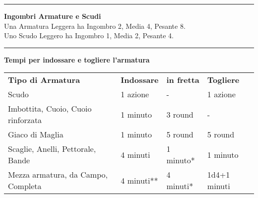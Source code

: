 \documentclass[a4paper,12 pt,openany]{book}
\newcommand{\riga}{\rule{\textwidth}{0.4pt}}
\begin{document}
\begin{textblock*}{15cm}
\riga

\textbf{Ingombri Armature e Scudi}\\
Una Armatura Leggera ha Ingombro 2, Media 4, Pesante 8.\\
Uno Scudo Leggero ha Ingombro 1, Media 2, Pesante 4.

\riga

\textbf{Tempi per indossare e togliere l'armatura}\\

\begin{tabular}{llll}
\textbf{Tipo di Armatura}& \textbf{Indossare} & \textbf{in fretta} & \textbf{Togliere}\\
Scudo								& 1 azione 	& -     	& 1 azione\\
Imbottita, Cuoio, Cuoio rinforzata  & 1 minuto	& 3 round  	& - \\
Giaco di Maglia						& 1 minuto	& 5 round  & 5 round\\
Scaglie, Anelli, Pettorale, Bande   & 4 minuti 	& 1 minuto{*}  & 1 minuto\\
Mezza armatura, da Campo, Completa  & 4 minuti{*}{*}& 4 minuti{*}& 1d4+1 minuti\\
\end{tabular}

\end{textblock*}
\end{document}
